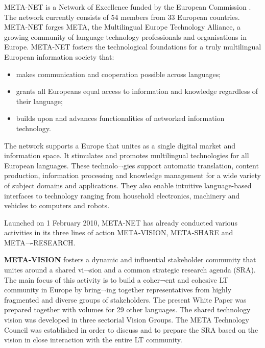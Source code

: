 \clearpage



\begin{multicols}{2}
META-NET is a Network of Excellence funded by the European Commission \cite{rehm2011}. The network currently consists of 54 members from 33 European countries. META-NET forges META, the Multilingual Europe Technology Alliance, a growing community of language technology professionals and organisations in Europe. META-NET fosters the technological foundations for a truly multilingual European information society that:

\begin{itemize}
\item makes communication and cooperation possible across languages;
\item grants all Europeans equal access to information and knowledge regardless of their language; 
\item builds upon and advances functionalities of networked information technology.
\end{itemize}

The network supports a Europe that unites as a single digital market and information space. It stimulates and promotes multilingual technologies for all European languages. These technolo¬gies support automatic translation, content production, information processing and knowledge management for a wide variety of subject domains and applications. They also enable intuitive language-based interfaces to technology ranging from household electronics, machinery and vehicles to computers and robots.

Launched on 1 February 2010, META-NET has already conducted various activities in its three lines of action META-VISION, META-SHARE and META¬-RESEARCH. 

\textbf{META-VISION} fosters a dynamic and inﬂuential stakeholder community that unites around a shared vi¬sion and a common strategic research agenda (SRA). The main focus of this activity is to build a coher¬ent and cohesive LT community in Europe by bring¬ing together representatives from highly fragmented and diverse groups of stakeholders. The present White Paper was prepared together with volumes for 29 other languages. The shared technology vision was developed in three sectorial Vision Groups. The META Technology Council was established in order to discuss and to prepare the SRA based on the vision in close interaction with the entire LT community. 


\end{multicols}
